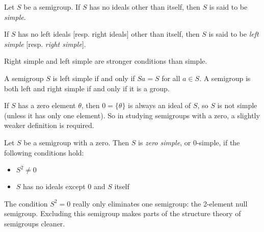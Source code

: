 \documentclass[12pt]{article}
\begin{document}
Let $S$ be a semigroup.  If $S$ has no ideals other than itself, then $S$ is said to be \emph{simple}.

If $S$ has no left ideals [resp. right ideals] other than itself, then $S$ is said to be \emph{left simple} [resp. \emph{right simple}].

Right simple and left simple are stronger conditions than simple.

A semigroup $S$ is left simple if and only if $Sa = S$ for all $a \in S$.
A semigroup is both left and right simple if and only if it is a group.

If $S$ has a zero element $\theta$, then $0 = \{ \theta \}$ is always an ideal of $S$, so $S$ is not simple (unless it has only one element).  So in studying semigroups with a zero, a slightly weaker definition is required.

Let $S$ be a semigroup with a zero.  Then $S$ is \emph{zero simple}, or $0$-simple, if the following conditions hold:
\begin{itemize}
\item $S^2 \neq 0$
\item $S$ has no ideals except $0$ and $S$ itself
\end{itemize}

The condition $S^2 = 0$ really only eliminates one semigroup: the 2-element null semigroup.  Excluding this semigroup makes parts of the structure theory of semigroups cleaner.
\end{document}

